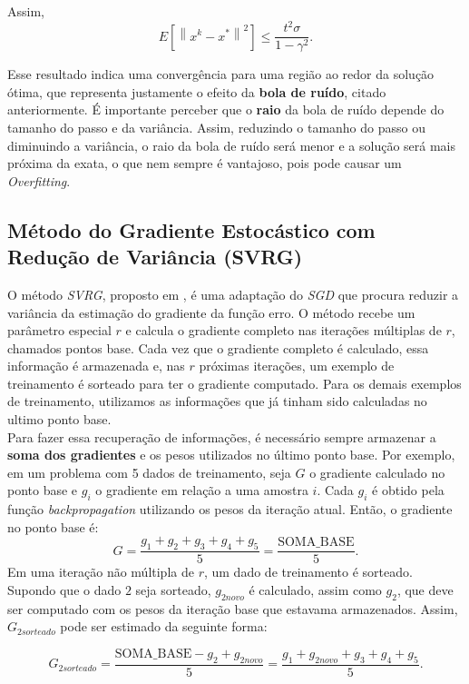 \documentclass[a4paper,12pt]{article}
\begin{document}
Assim, 
$$E\left[\left \| x^{k} - x^* \right \|^2\right] \leq \frac{t^2 \sigma}{1-\gamma^2}.$$


Esse resultado indica uma convergência para uma região ao redor da solução ótima, que representa justamente o efeito da \textbf{bola de ruído}, citado anteriormente. É importante perceber que o \textbf{raio} da bola de ruído depende do tamanho do passo e da variância. Assim, reduzindo o tamanho do passo ou diminuindo a variância, o raio da bola de ruído será menor e a solução será mais próxima da exata, o que nem sempre é vantajoso, pois pode causar um \textit{Overfitting}.



\subsection{Método do Gradiente Estocástico com Redução de Variância (SVRG)}

O método \textit{SVRG}, proposto em \cite{svrgpaper}, é uma adaptação do \textit{SGD} que procura reduzir a variância da estimação do gradiente da função erro. O método recebe um parâmetro especial $r$ e calcula o gradiente completo nas iterações múltiplas de $r$, chamados pontos base. Cada vez que o gradiente completo é calculado, essa informação é armazenada e, nas $r$ próximas iterações, um exemplo de treinamento é sorteado para ter o gradiente computado. Para os demais exemplos de treinamento, utilizamos as informações que já tinham sido calculadas no ultimo ponto base.\\

Para fazer essa recuperação de informações, é necessário sempre armazenar a \textbf{soma dos gradientes} e os pesos utilizados no último ponto base. Por exemplo, em um problema com 5 dados de treinamento, seja $G$ o gradiente calculado no ponto base e $g_i$ o gradiente em relação a uma amostra $i$. Cada $g_i$ é obtido pela função \textit{backpropagation} utilizando os pesos da iteração atual. Então, o gradiente no ponto base é:
$$G = \frac{g_1 + g_2 + g_3 + g_4 + g_5}{5} = \frac{\text{SOMA\_BASE}}{5}.$$
Em uma iteração não múltipla de $r$, um dado de treinamento é sorteado. Supondo que o dado $2$ seja sorteado, $g_{2novo}$ é calculado, assim como $g_2$, que deve ser computado com os pesos da iteração base que estavama armazenados. Assim, $G_{2sorteado}$ pode ser estimado da seguinte forma:

$$G_{2sorteado} = \frac{\text{SOMA\_BASE} - g_2 + g_{2novo} }{5}  = \frac{g_1 + g_{2novo} + g_3 + g_4 + g_5}{5}.$$
\end{document}
